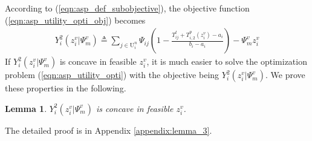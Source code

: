 \documentclass[10pt,journal, compsoc]{IEEEtran}
\newtheorem{lemma}{Lemma}
\begin{document}
According to %
(\ref{eqn:asp_def_subobjective}), the objective function (\ref{eqn:asp_utility_opti_obj}) becomes
\begin{equation} \label{eqn:asp_case2_objective}
\begin{aligned}
Y_i^2(z_i^v|\Psi_m^v) \triangleq \sum_{j \in \mathrm{U}_i^{n}}\Psi_{ij}(1-\frac{T_{ij}^t + T_{i,2}^p(z_i^v)-a_i}{b_i-a_i}) - \Psi_m^vz_i^v
\end{aligned}
\end{equation}
If $Y_i^2(z_i^v|\Psi_m^v)$ is concave in feasible $z_i^v$, it is much easier to solve the optimization problem (\ref{eqn:asp_utility_opti}) with the objective being $Y_i^2(z_i^v|\Psi_m^v)$. We prove these properties in the following.
\begin{lemma} \label{lemma:asp_case2_utility_concave}
$Y_i^2(z_i^v|\Psi_m^v)$ is concave in feasible $z_i^v$.
\end{lemma}
The detailed proof is in Appendix \ref{appendix:lemma_3}.
\end{document}

